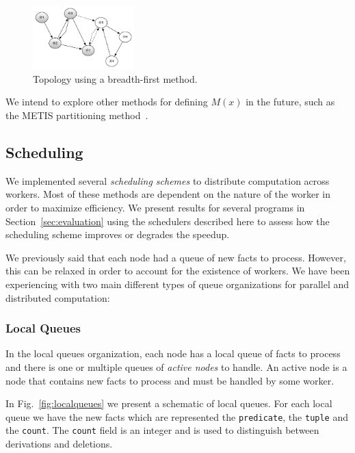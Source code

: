 \documentclass[preprint]{sigplanconf}
\begin{document}
\begin{figure}[ht]
  \centering
    \includegraphics[width=0.35\textwidth]{figures/topology1.pdf}
  \caption{Topology using a breadth-first method.}
  \label{fig:topology1}
\end{figure}

We intend to explore other methods for defining $M(x)$ in the future, such as the METIS
partitioning method~\cite{Karypis:1998:FHQ:305219.305248}.


\subsection{Scheduling}

We implemented several \emph{scheduling schemes} to distribute computation across workers.
Most of these methods are dependent on the nature of the worker in order to maximize efficiency.
We present results for several programs in Section~\ref{sec:evaluation} using the schedulers
described here to assess how the scheduling scheme improves or degrades the speedup.

We previously said that each node had a queue of new facts to process. However, this can be relaxed
in order to account for the existence of workers. We have been experiencing with two main different
types of queue organizations for parallel and distributed computation:

\subsubsection{Local Queues}

In the local queues organization, each node has a local queue of facts to process and
there is one or multiple queues of \emph{active nodes} to handle.
An active node is a node that contains new facts to process and must be handled by some worker.

In Fig.~\ref{fig:localqueues} we present a schematic of local queues. For each local queue
we have the new facts which are represented the \texttt{predicate}, the \texttt{tuple} and the
\texttt{count}. The \texttt{count} field is an integer and is used to distinguish between
derivations and deletions.
\end{document}
